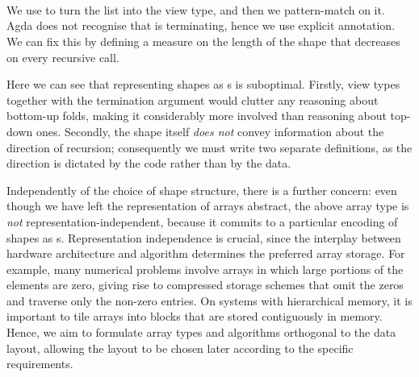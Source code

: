 \begin{code}[hide]%
%
\>[2]\AgdaSpace{}%
\AgdaInductiveConstructor{[]}%
\>[17]\AgdaSymbol{=}\AgdaSpace{}%
\AgdaInductiveConstructor{[]}\<%
\\
%
\>[2]\AgdaSpace{}%
\AgdaSymbol{(}\AgdaSpace{}%
\AgdaSpace{}%
\AgdaSymbol{)}\AgdaSpace{}%
\AgdaSpace{}%
\AgdaSpace{}%
\<%
\\
%
\>[2]\AgdaSpace{}%
\AgdaSymbol{|}\AgdaSpace{}%
\AgdaInductiveConstructor{[]}%
\>[17]\AgdaSymbol{=}\AgdaSpace{}%
\AgdaInductiveConstructor{[]}\AgdaSpace{}%
\AgdaSpace{}%
\<%
\\
%
\>[2]\AgdaSpace{}%
\AgdaSymbol{|}\AgdaSpace{}%
\AgdaSpace{}%
\AgdaSpace{}%
%
\>[17]\AgdaSymbol{=}\AgdaSpace{}%
\AgdaSymbol{(}\AgdaSpace{}%
\AgdaSpace{}%
\AgdaSymbol{)}\AgdaSpace{}%
\AgdaSpace{}%
\<%
\end{code}
We use  to turn the list into the view type, and then
we pattern-match on it.  Agda does not recognise that  is 
terminating, hence we use explicit annotation.  We can
fix this by defining a measure on the length of the shape that
decreases on every recursive call.

Here we can see that representing shapes as s is suboptimal.  Firstly,
view types together with the termination argument would clutter any reasoning
about bottom-up folds, making it considerably more involved than
reasoning about top-down ones.  Secondly, the shape itself \emph{does not} convey
information about the direction of recursion; consequently we must write two
separate definitions, as the direction is dictated by the code rather than by
the data.

Independently of the choice of shape structure, there is a further concern:
even though we have left the representation of arrays abstract, the above
array type is \emph{not} representation-independent, because it commits to a
particular encoding of shapes as s.  Representation independence is
crucial, since the interplay between hardware architecture and algorithm
determines the preferred array storage.  For example, many numerical
problems involve arrays in which large portions of the elements are zero,
giving rise to compressed storage schemes that omit the zeros and traverse only
the non-zero entries.  On systems with hierarchical memory, it is important to
tile arrays into blocks that are stored contiguously in memory.  Hence, we aim
to formulate array types and algorithms orthogonal to the data layout, allowing
the layout to be chosen later according to the specific requirements.

